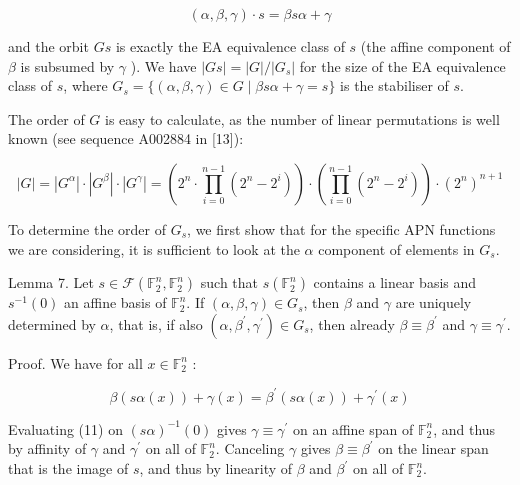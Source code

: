 \documentclass[10pt]{article}
\begin{document}
\begin{equation*}
(\alpha, \beta, \gamma) \cdot s=\beta s \alpha+\gamma \tag{9}
\end{equation*}


and the orbit $G s$ is exactly the EA equivalence class of $s$ (the affine component of $\beta$ is subsumed by $\gamma$ ). We have $|G s|=|G| /\left|G_{s}\right|$ for the size of the EA equivalence class of $s$, where $G_{s}=\{(\alpha, \beta, \gamma) \in G \mid \beta s \alpha+\gamma=s\}$ is the stabiliser of $s$.

The order of $G$ is easy to calculate, as the number of linear permutations is well known (see sequence A002884 in [13]):


\begin{equation*}
|G|=\left|G^{\alpha}\right| \cdot\left|G^{\beta}\right| \cdot\left|G^{\gamma}\right|=\left(2^{n} \cdot \prod_{i=0}^{n-1}\left(2^{n}-2^{i}\right)\right) \cdot\left(\prod_{i=0}^{n-1}\left(2^{n}-2^{i}\right)\right) \cdot\left(2^{n}\right)^{n+1} \tag{10}
\end{equation*}


To determine the order of $G_{s}$, we first show that for the specific APN functions we are considering, it is sufficient to look at the $\alpha$ component of elements in $G_{s}$.

Lemma 7. Let $s \in \mathcal{F}\left(\mathbb{F}_{2}^{n}, \mathbb{F}_{2}^{n}\right)$ such that $s\left(\mathbb{F}_{2}^{n}\right)$ contains a linear basis and $s^{-1}(0)$ an affine basis of $\mathbb{F}_{2}^{n}$. If $(\alpha, \beta, \gamma) \in G_{s}$, then $\beta$ and $\gamma$ are uniquely determined by $\alpha$, that is, if also $\left(\alpha, \beta^{\prime}, \gamma^{\prime}\right) \in G_{s}$, then already $\beta \equiv \beta^{\prime}$ and $\gamma \equiv \gamma^{\prime}$.

Proof. We have for all $x \in \mathbb{F}_{2}^{n}$ :


\begin{equation*}
\beta(s \alpha(x))+\gamma(x)=\beta^{\prime}(s \alpha(x))+\gamma^{\prime}(x) \tag{11}
\end{equation*}


Evaluating (11) on $(s \alpha)^{-1}(0)$ gives $\gamma \equiv \gamma^{\prime}$ on an affine span of $\mathbb{F}_{2}^{n}$, and thus by affinity of $\gamma$ and $\gamma^{\prime}$ on all of $\mathbb{F}_{2}^{n}$. Canceling $\gamma$ gives $\beta \equiv \beta^{\prime}$ on the linear span that is the image of $s$, and thus by linearity of $\beta$ and $\beta^{\prime}$ on all of $\mathbb{F}_{2}^{n}$.
\end{document}
